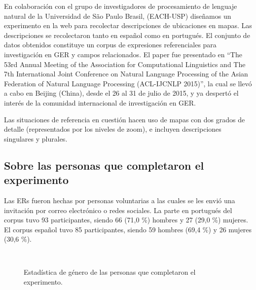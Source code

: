 En colaboraci\'on con el grupo de investigadores de procesamiento de lenguaje natural de la Universidad de S\~ao Paulo Brasil, (EACH-USP) dise\~namos un experimento en la web para recolectar descripciones de ubicaciones en mapas. Las descripciones se recolectaron tanto en espa\~nol como en portugu\'es. El conjunto de datos obtenidos constituye un corpus de expresiones referenciales para investigaci\'on en GER y campos relacionados. El paper \cite{DBLP:conf/acl/AltamiranoFPB15} fue presentado en ``The 53rd Annual Meeting of the Association for Computational Linguistics and The 7th International Joint Conference on Natural Language Processing of the Asian Federation of Natural Language Processing (ACL-IJCNLP 2015)'', la cual se llev\'o a cabo en Beijing (China), desde el 26 al 31 de julio de 2015, y ya despert\'o el inter\'es de la comunidad internacional de investigaci\'on en GER.

Las situaciones de referencia en cuesti\'on hacen uso de mapas con dos grados de detalle (representados por los niveles de zoom), e incluyen descripciones singulares y plurales.



\subsection{Sobre las personas que completaron el experimento}
\label{corpus-voluntarios}

Las ERs fueron hechas por personas voluntarias a las cuales se les envi\'o una invitaci\'on por correo electr\'onico o redes sociales. La parte en portugu\'es del corpus tuvo 93 participantes, siendo 66 (71,0 \%) hombres y 27 (29,0 \%) mujeres. El corpus espa\~nol tuvo 85 participantes, siendo 59 hombres (69,4 \%) y 26 mujeres (30,6 \%).
\begin{figure}[ht]
\begin{center}
\\[0pt]
\caption{Estad\'istica de g\'enero de las personas que completaron el experimento.}
\label{estadistica-mf}
\end{center}
\end{figure}
